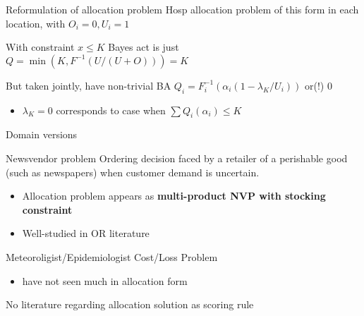 \documentclass[
  ignorenonframetext,
]{beamer}
\providecommand{\tightlist}{%
  \setlength{\itemsep}{0pt}\setlength{\parskip}{0pt}}\usepackage{longtable,booktabs,array}
\begin{document}
\begin{frame}{Reformulation of allocation problem}
\protect\hypertarget{reformulation-of-allocation-problem}{}
Hosp allocation problem of this form in each location, with
\(O_i=0, U_i=1\)

With constraint \(x \leq K\) Bayes act is just
\(Q=\min(K,F^{-1} (U/(U+O)))=K\)

But taken jointly, have non-trivial BA
\(Q_i = F_i^{-1}\left(\alpha_i\left(1-\lambda_K / U_i\right)\right)\)
or(!) 0

\begin{itemize}
\tightlist
\item
  \(\lambda_K =0\) corresponds to case when
  \(\sum Q_i(\alpha_i) \leq K\)
\end{itemize}
\end{frame}

\begin{frame}{Domain versions}
\protect\hypertarget{domain-versions}{}
\begin{block}{Newsvendor problem}
\protect\hypertarget{newsvendor-problem}{}
Ordering decision faced by a retailer of a perishable good (such as
newspapers) when customer demand is uncertain.

\begin{itemize}
\tightlist
\item
  Allocation problem appears as \textbf{multi-product NVP with stocking
  constraint}
\item
  Well-studied in OR literature
\end{itemize}
\end{block}

\begin{block}{Meteoroligist/Epidemiologist Cost/Loss Problem}
\protect\hypertarget{meteoroligistepidemiologist-costloss-problem}{}
\begin{itemize}
\tightlist
\item
  have not seen much in allocation form
\end{itemize}

No literature regarding allocation solution as scoring rule
\end{block}
\end{frame}
\end{document}
